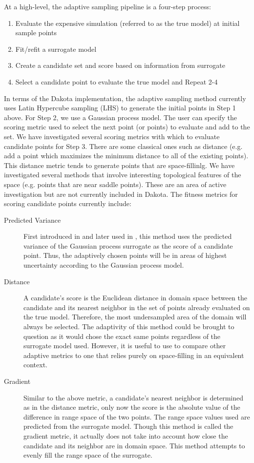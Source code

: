 At a high-level, the adaptive sampling pipeline is a four-step process:
\begin{enumerate}
\item Evaluate the expensive simulation (referred to as the true model) at
initial sample points
\item Fit/refit a surrogate model
\item Create a candidate set and score based on information from surrogate
\item Select a candidate point to evaluate the true model and Repeat 2-4
\end{enumerate}

In terms of the Dakota implementation, the adaptive sampling method 
currently uses Latin Hypercube sampling (LHS) to generate the initial 
points in Step 1 above. For Step 2, we use a Gaussian process model. 
The user can specify the scoring metric used to select the 
next point (or points) to evaluate and add to the set. 
We have investigated several scoring metrics with which to evaluate 
candidate points for Step 3. There are some classical ones such as distance 
(e.g. add a point which maximizes the minimum distance to all of 
the existing points). This distance metric tends to generate 
points that are space-fillinlg. We have investigated several 
methods that involve interesting topological features of the 
space (e.g. points that are near saddle points). These are 
an area of active investigation but are not currently included 
in Dakota. The fitness metrics for scoring 
candidate points currently include: 
\begin{description}
\item[Predicted Variance]
First introduced in \cite{MacKay} and later
used in \cite{Seo}, this method uses the predicted
variance of the Gaussian process surrogate as the score of a candidate 
point. Thus, the adaptively chosen points will be in areas of highest 
uncertainty according to the Gaussian process model.
\item[Distance]
A candidate's score is the Euclidean distance in domain space between the
candidate and its nearest neighbor in the set of points already evaluated on the
true model. Therefore, the most undersampled area of the domain will always be
selected. The adaptivity of this method could be brought to question as it would
chose the exact same points regardless of the surrogate model used. However, it
is useful to use to compare other adaptive metrics to one that relies purely on
space-filling in an equivalent context.
\item[Gradient]
Similar to the above metric, a candidate's nearest neighbor is determined as in
the distance metric, only now the score is the absolute value of the difference
in range space of the two points. The range space values used are predicted
from the surrogate model. Though this method is called the gradient metric, it
actually does not take into account how close the candidate and its neighbor are
in domain space. This method attempts to evenly fill the range space of the
surrogate.
\end{description}

